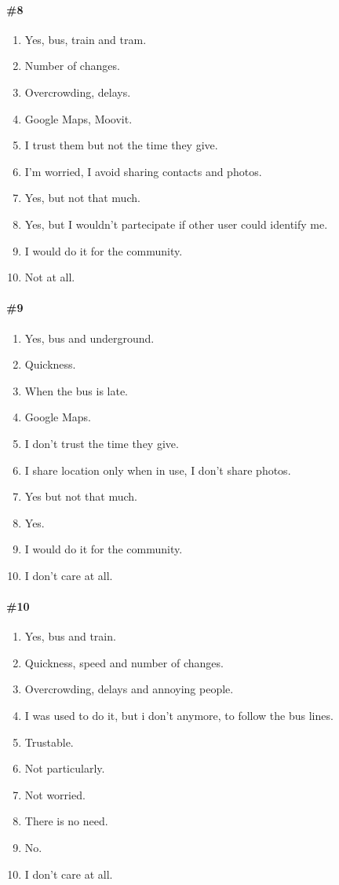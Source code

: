 \documentclass[a4paper, 10pt]{article}
\begin{document}
\paragraph*{\#8}
\begin{enumerate}
    \item Yes, bus, train and tram.
    \item Number of changes.
    \item Overcrowding, delays.
    \item Google Maps, Moovit.
    \item I trust them but not the time they give.
    \item I'm worried, I avoid sharing contacts and photos.
    \item Yes, but not that much.
    \item Yes, but I wouldn't partecipate if other user could identify me.
    \item I would do it for the community.
    \item Not at all.
\end{enumerate}

\paragraph*{\#9}
\begin{enumerate}
    \item Yes, bus and underground.
    \item Quickness.
    \item When the bus is late.
    \item Google Maps.
    \item I don't trust the time they give.
    \item I share location only when in use, I don't share photos.
    \item Yes but not that much.
    \item Yes.
    \item I would do it for the community.
    \item I don't care at all.                   
\end{enumerate}


\paragraph*{\#10}

\begin{enumerate}
    \item  Yes, bus and train.
    \item  Quickness, speed and number of changes.
    \item  Overcrowding, delays and annoying people.
    \item  I was used to do it, but i don't anymore, to follow the bus lines.
    \item  Trustable.
    \item  Not particularly.
    \item  Not worried. 
    \item  There is no need.
    \item  No.
    \item  I don't care at all.
\end{enumerate}
\end{document}
